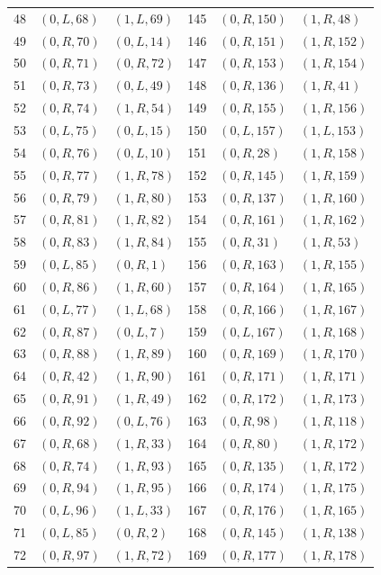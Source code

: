 \begin{longtable}{rll@{\qquad\qquad}rll}
48 & $(0,L,68)$ & $(1,L,69)$ & 145 & $(0,R,150)$ & $(1,R,48)$\\
49 & $(0,R,70)$ & $(0,L,14)$ & 146 & $(0,R,151)$ & $(1,R,152)$\\
50 & $(0,R,71)$ & $(0,R,72)$ & 147 & $(0,R,153)$ & $(1,R,154)$\\
51 & $(0,R,73)$ & $(0,L,49)$ & 148 & $(0,R,136)$ & $(1,R,41)$\\
52 & $(0,R,74)$ & $(1,R,54)$ & 149 & $(0,R,155)$ & $(1,R,156)$\\
53 & $(0,L,75)$ & $(0,L,15)$ & 150 & $(0,L,157)$ & $(1,L,153)$\\
54 & $(0,R,76)$ & $(0,L,10)$ & 151 & $(0,R,28)$ & $(1,R,158)$\\
55 & $(0,R,77)$ & $(1,R,78)$ & 152 & $(0,R,145)$ & $(1,R,159)$\\
56 & $(0,R,79)$ & $(1,R,80)$ & 153 & $(0,R,137)$ & $(1,R,160)$\\
57 & $(0,R,81)$ & $(1,R,82)$ & 154 & $(0,R,161)$ & $(1,R,162)$\\
58 & $(0,R,83)$ & $(1,R,84)$ & 155 & $(0,R,31)$ & $(1,R,53)$\\
59 & $(0,L,85)$ & $(0,R,1)$ & 156 & $(0,R,163)$ & $(1,R,155)$\\
60 & $(0,R,86)$ & $(1,R,60)$ & 157 & $(0,R,164)$ & $(1,R,165)$\\
61 & $(0,L,77)$ & $(1,L,68)$ & 158 & $(0,R,166)$ & $(1,R,167)$\\
62 & $(0,R,87)$ & $(0,L,7)$ & 159 & $(0,L,167)$ & $(1,R,168)$\\
63 & $(0,R,88)$ & $(1,R,89)$ & 160 & $(0,R,169)$ & $(1,R,170)$\\
64 & $(0,R,42)$ & $(1,R,90)$ & 161 & $(0,R,171)$ & $(1,R,171)$\\
65 & $(0,R,91)$ & $(1,R,49)$ & 162 & $(0,R,172)$ & $(1,R,173)$\\
66 & $(0,R,92)$ & $(0,L,76)$ & 163 & $(0,R,98)$ & $(1,R,118)$\\
67 & $(0,R,68)$ & $(1,R,33)$ & 164 & $(0,R,80)$ & $(1,R,172)$\\
68 & $(0,R,74)$ & $(1,R,93)$ & 165 & $(0,R,135)$ & $(1,R,172)$\\
69 & $(0,R,94)$ & $(1,R,95)$ & 166 & $(0,R,174)$ & $(1,R,175)$\\
70 & $(0,L,96)$ & $(1,L,33)$ & 167 & $(0,R,176)$ & $(1,R,165)$\\
71 & $(0,L,85)$ & $(0,R,2)$ & 168 & $(0,R,145)$ & $(1,R,138)$\\
72 & $(0,R,97)$ & $(1,R,72)$ & 169 & $(0,R,177)$ & $(1,R,178)$\\

\end{longtable}
